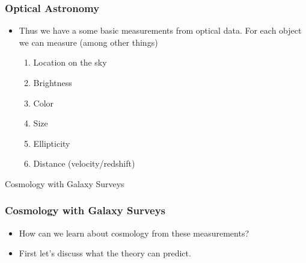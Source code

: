 \documentclass{beamer}
\begin{document}
\frame
{

    \frametitle{Optical Astronomy}


    \begin{itemize}

        \item Thus we have a some basic measurements from optical data.  For
            each object we can measure (among other things)

            \begin{enumerate}

                \item Location on the sky

                \item Brightness

                \item Color

                \item Size

                \item Ellipticity

                \item Distance (velocity/redshift)

            \end{enumerate}


    \end{itemize}

}

\frame
{

    {\huge Cosmology with Galaxy Surveys}

}


\frame
{

    \frametitle{Cosmology with Galaxy Surveys}


    \begin{itemize}

        \item How can we learn about cosmology from these measurements?

        \item First let's discuss what the theory can predict.

    \end{itemize}

}
\end{document}

